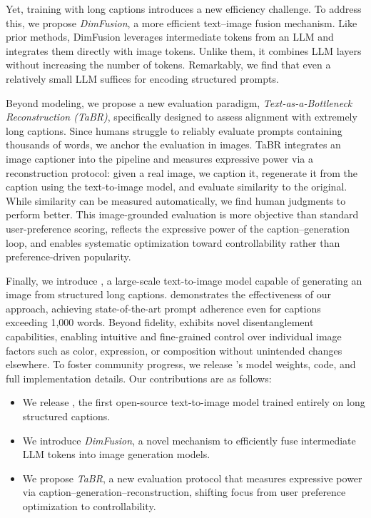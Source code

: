Yet, training with long captions introduces a new efficiency challenge. To address this, we propose \textit{DimFusion}, a more efficient text–image fusion mechanism. Like prior methods, DimFusion leverages intermediate tokens from an LLM and integrates them directly with image tokens. Unlike them, it combines LLM layers without increasing the number of tokens. Remarkably, we find that even a relatively small LLM suffices for encoding structured prompts.



Beyond modeling, we propose a new evaluation paradigm, \emph{Text-as-a-Bottleneck Reconstruction (TaBR)}, specifically designed to assess alignment with extremely long captions. Since humans struggle to reliably evaluate prompts containing thousands of words, we anchor the evaluation in images. TaBR integrates an image captioner into the pipeline and measures expressive power via a reconstruction protocol: given a real image, we caption it, regenerate it from the caption using the text-to-image model, and evaluate similarity to the original. While similarity can be measured automatically, we find human judgments to perform better. This image-grounded evaluation is more objective than standard user-preference scoring, reflects the expressive power of the caption–generation loop, and enables systematic optimization toward controllability rather than preference-driven popularity.






Finally, we introduce \emph{\modelname{}}, a large-scale text-to-image model capable of generating an image from structured long captions. \modelname{} demonstrates the effectiveness of our approach, achieving state-of-the-art prompt adherence even for captions exceeding 1,000 words. Beyond fidelity, \modelname{} exhibits novel disentanglement capabilities, enabling intuitive and fine-grained control over individual image factors such as color, expression, or composition without unintended changes elsewhere. To foster community progress, we release \modelname{}’s model weights, code, and full implementation details.
Our contributions are as follows:
\begin{itemize}
    \item  We release \emph{\modelname{}}, the first open-source text-to-image model trained entirely on long structured captions.
    \item We introduce \emph{DimFusion}, a novel mechanism to efficiently fuse intermediate LLM tokens into image generation models.
    \item We propose \emph{TaBR}, a new evaluation protocol that measures expressive power via caption–generation–reconstruction, shifting focus from user preference optimization to controllability.
\end{itemize}













